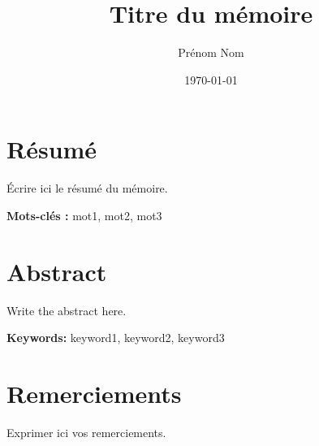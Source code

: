 \documentclass[12pt,a4paper,openright]{book}
\title{Titre du mémoire}
\author{Prénom Nom}
\date{\today}
\begin{document}

\frontmatter           %

\maketitle
\thispagestyle{empty}
\cleardoublepage

\chapter*{Résumé}
Écrire ici le résumé du mémoire.

\vspace{1cm}
\noindent\textbf{Mots-clés :} mot1, mot2, mot3

\cleardoublepage

\chapter*{Abstract}
Write the abstract here.

\vspace{1cm}
\noindent\textbf{Keywords:} keyword1, keyword2, keyword3

\cleardoublepage

\chapter*{Remerciements}
Exprimer ici vos remerciements.

\cleardoublepage

\tableofcontents
\cleardoublepage

\mainmatter            %








\end{document}

